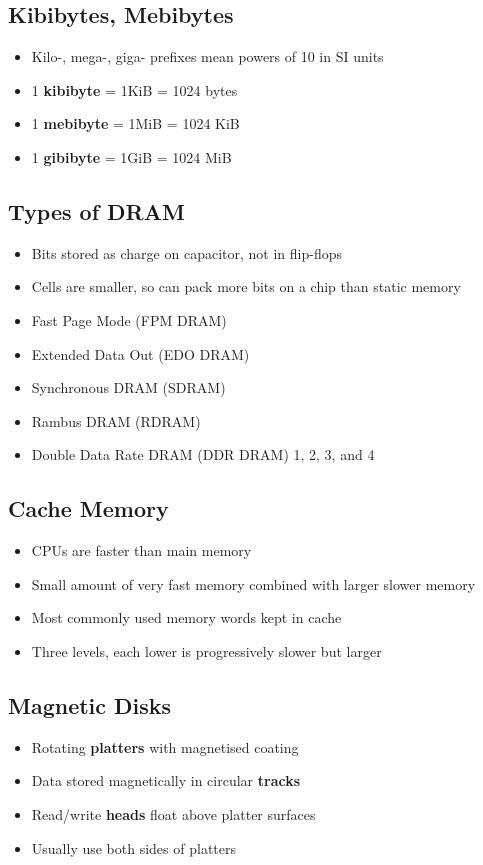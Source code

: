 \subsection{Kibibytes, Mebibytes}
\begin{itemize}
	\item Kilo-, mega-, giga- prefixes mean powers of 10 in SI units
	\item 1 \textbf{kibibyte} = 1KiB = 1024 bytes
	\item 1 \textbf{mebibyte} = 1MiB = 1024 KiB
	\item 1 \textbf{gibibyte} = 1GiB = 1024 MiB	
\end{itemize}

\subsection{Types of DRAM}
\begin{itemize}
	\item Bits stored as charge on capacitor, not in flip-flops
	\item Cells are smaller, so can pack more bits on a chip than static memory
	\item Fast Page Mode (FPM DRAM)
	\item Extended Data Out (EDO DRAM)
	\item Synchronous DRAM (SDRAM)
	\item Rambus DRAM (RDRAM)
	\item Double Data Rate DRAM (DDR DRAM) 1, 2, 3, and 4	
\end{itemize}

\subsection{Cache Memory}
\begin{itemize}
	\item CPUs are faster than main memory
	\item Small amount of very fast memory combined with larger slower memory
	\item Most commonly used memory words kept in cache
	\item Three levels, each lower is progressively slower but larger	
\end{itemize}

\subsection{Magnetic Disks}
\begin{itemize}
	\item Rotating \textbf{platters} with magnetised coating
	\item Data stored magnetically in circular \textbf{tracks}
	\item Read/write \textbf{heads} float above platter surfaces
	\item Usually use both sides of platters	
\end{itemize}

